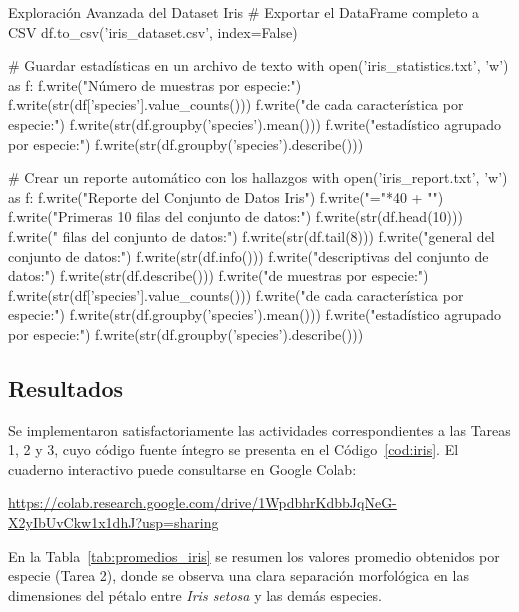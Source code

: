 \documentclass[11pt,letterpaper]{article}
\begin{document}
\begin{codigo}[label=cod:iris]{Exploración Avanzada del Dataset Iris}
# Exportar el DataFrame completo a CSV
df.to_csv('iris_dataset.csv', index=False)

# Guardar estadísticas en un archivo de texto
with open('iris_statistics.txt', 'w') as f:
    f.write("Número de muestras por especie:\n")
    f.write(str(df['species'].value_counts()))
    f.write("\n\nPromedios de cada característica por especie:\n")
    f.write(str(df.groupby('species').mean()))
    f.write("\n\nResumen estadístico agrupado por especie:\n")
    f.write(str(df.groupby('species').describe()))

# Crear un reporte automático con los hallazgos
with open('iris_report.txt', 'w') as f:
    f.write("Reporte del Conjunto de Datos Iris\n")
    f.write("="*40 + "\n\n")
    f.write("Primeras 10 filas del conjunto de datos:\n")
    f.write(str(df.head(10)))
    f.write("\n{} filas del conjunto de datos:\n")
    f.write(str(df.tail(8)))
    f.write("\n{} general del conjunto de datos:\n")
    f.write(str(df.info()))
    f.write("\n{} descriptivas del conjunto de datos:\n")
    f.write(str(df.describe()))
    f.write("\n{} de muestras por especie:\n")
    f.write(str(df['species'].value_counts()))
    f.write("\n\nPromedios de cada característica por especie:\n")
    f.write(str(df.groupby('species').mean()))
    f.write("\n\nResumen estadístico agrupado por especie:\n")
    f.write(str(df.groupby('species').describe()))

\end{codigo}


\subsection*{Resultados}

Se implementaron satisfactoriamente las actividades correspondientes a las Tareas 1, 2 y 3, cuyo código fuente íntegro se presenta en el Código~\ref{cod:iris}. El cuaderno interactivo puede consultarse en Google Colab:

\begin{center}
    \url{https://colab.research.google.com/drive/1WpdbhrKdbbJqNeG-X2yIbUvCkw1x1dhJ?usp=sharing}
\end{center}

En la Tabla~\ref{tab:promedios_iris} se resumen los valores promedio obtenidos por especie (Tarea 2), donde se observa una clara separación morfológica en las dimensiones del pétalo entre \textit{Iris setosa} y las demás especies.
\end{document}
